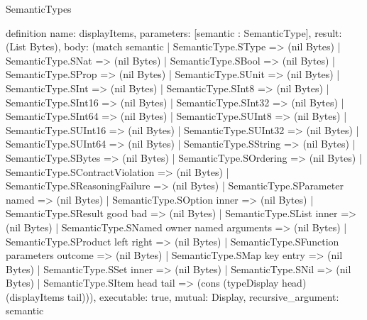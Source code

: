 \begin{lexlean}{SemanticTypes}
\begin{semanticmodule}
definition{
  name: displayItems,
  parameters: [semantic : SemanticType],
  result: (List Bytes),
  body: (match semantic
    | SemanticType.SType => (nil Bytes)
    | SemanticType.SNat => (nil Bytes)
    | SemanticType.SBool => (nil Bytes)
    | SemanticType.SProp => (nil Bytes)
    | SemanticType.SUnit => (nil Bytes)
    | SemanticType.SInt => (nil Bytes)
    | SemanticType.SInt8 => (nil Bytes)
    | SemanticType.SInt16 => (nil Bytes)
    | SemanticType.SInt32 => (nil Bytes)
    | SemanticType.SInt64 => (nil Bytes)
    | SemanticType.SUInt8 => (nil Bytes)
    | SemanticType.SUInt16 => (nil Bytes)
    | SemanticType.SUInt32 => (nil Bytes)
    | SemanticType.SUInt64 => (nil Bytes)
    | SemanticType.SString => (nil Bytes)
    | SemanticType.SBytes => (nil Bytes)
    | SemanticType.SOrdering => (nil Bytes)
    | SemanticType.SContractViolation => (nil Bytes)
    | SemanticType.SReasoningFailure => (nil Bytes)
    | SemanticType.SParameter named => (nil Bytes)
    | SemanticType.SOption inner => (nil Bytes)
    | SemanticType.SResult good bad => (nil Bytes)
    | SemanticType.SList inner => (nil Bytes)
    | SemanticType.SNamed owner named arguments => (nil Bytes)
    | SemanticType.SProduct left right => (nil Bytes)
    | SemanticType.SFunction parameters outcome => (nil Bytes)
    | SemanticType.SMap key entry => (nil Bytes)
    | SemanticType.SSet inner => (nil Bytes)
    | SemanticType.SNil => (nil Bytes)
    | SemanticType.SItem head tail => (cons (typeDisplay head) (displayItems tail))),
  executable: true,
  mutual: Display,
  recursive_argument: semantic
}


\end{semanticmodule}
\end{lexlean}
